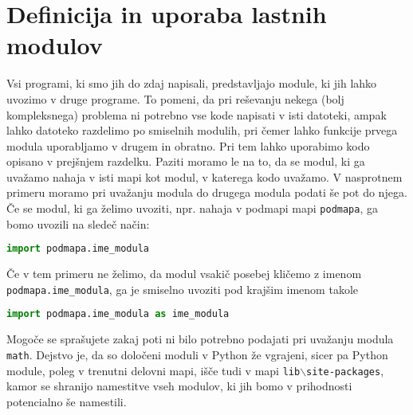 \section{Definicija in uporaba lastnih modulov}
Vsi programi, ki smo jih do zdaj napisali, predstavljajo module, ki jih lahko uvozimo v druge programe. To pomeni, da pri reševanju nekega (bolj kompleksnega) problema ni potrebno vse kode napisati v isti datoteki, ampak lahko datoteko razdelimo po smiselnih modulih, pri čemer lahko funkcije prvega modula uporabljamo v drugem in obratno. Pri tem lahko uporabimo kodo opisano v prejšnjem razdelku. Paziti moramo le na to, da se modul, ki ga uvažamo nahaja v isti mapi kot modul, v katerega kodo uvažamo. V nasprotnem primeru moramo pri uvažanju modula do drugega modula podati še pot do njega. Če se modul, ki ga želimo uvoziti, npr. nahaja v podmapi mapi \texttt{podmapa}, ga bomo uvozili na sledeč način:
\begin{lstlisting}[language=Python]
import podmapa.ime_modula
\end{lstlisting}
Če v tem primeru ne želimo, da modul vsakič posebej kličemo z imenom \texttt{podmapa.ime\_modula}, ga je smiselno uvoziti pod krajšim imenom takole
\begin{lstlisting}[language=Python]
import podmapa.ime_modula as ime_modula
\end{lstlisting}
Mogoče se sprašujete zakaj poti ni bilo potrebno podajati pri uvažanju modula \texttt{math}. Dejstvo je, da so določeni moduli v Python že vgrajeni, sicer pa Python module, poleg v trenutni delovni mapi, išče tudi v mapi \texttt{lib$\backslash$site-packages}, kamor se shranijo namestitve vseh modulov, ki jih bomo v prihodnosti potencialno še namestili.

